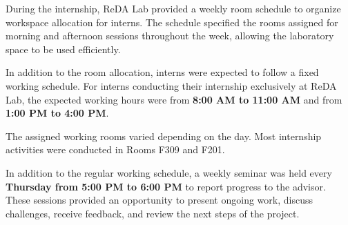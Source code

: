 \hs During the internship, ReDA Lab provided a weekly room schedule to organize workspace allocation for interns. The schedule specified the rooms assigned for morning and afternoon sessions throughout the week, allowing the laboratory space to be used efficiently.

In addition to the room allocation, interns were expected to follow a fixed working schedule. For interns conducting their internship exclusively at ReDA Lab, the expected working hours were from \textbf{8:00 AM to 11:00 AM} and from \textbf{1:00 PM to 4:00 PM}.

The assigned working rooms varied depending on the day. Most internship activities were conducted in Rooms F309 and F201.

In addition to the regular working schedule, a weekly seminar was held every \textbf{Thursday from 5:00 PM to 6:00 PM} to report progress to the advisor. These sessions provided an opportunity to present ongoing work, discuss challenges, receive feedback, and review the next steps of the project.
